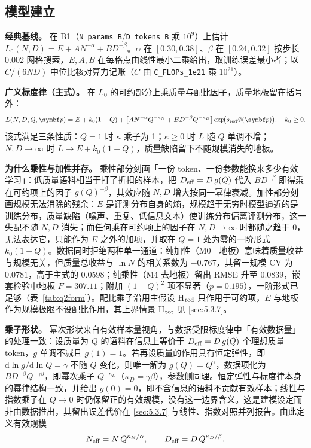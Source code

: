 \subsection{模型建立}
\label{sec:5.3.5}

\textbf{经典基线。} 在 B1（\texttt{N\_params\_B}/\texttt{D\_tokens\_B} 乘 $10^9$）上估计 $L_0(N,D)=E+AN^{-\alpha}+BD^{-\beta}$。$\alpha$ 在 $[0.30,0.38]$、$\beta$ 在 $[0.24,0.32]$ 按步长 $0.002$ 网格搜索，$E,A,B$ 在每格点由线性最小二乘给出，取训练误差最小者；以 $C/(6ND)$ 中位比核对算力记账（$C$ 由 \texttt{C\_FLOPs\_1e21} 乘 $10^{21}$）。

\textbf{广义标度律（主式）。} 在 $L_0$ 的可约部分上乘质量与配比因子，质量地板留在括号外：
\begin{equation*}
L(N,D,Q,\bp)=E+k_0(1-Q)+\bigl[AN^{-\alpha}Q^{-\kappa_N}+BD^{-\beta}Q^{-\kappa_D}\bigr]\exp\!\bigl(s_{\rm red}\tilde\varphi(\bp)\bigr),\quad k_0\ge0 .
\end{equation*}
该式满足三条性质：$Q=1$ 时 $\kappa$ 乘子为 1；$\kappa\ge0$ 时 $L$ 随 $Q$ 单调不增；$N,D\to\infty$ 时 $L\to E+k_0(1-Q)$，质量缺陷留下不随规模消失的地板。

\textbf{为什么乘性与加性并存。} 乘性部分刻画「一份 token、一份参数能换来多少有效学习」：低质量语料相当于打了折扣的样本，把 $D_{\rm eff}=D\,g(Q)$ 代入 $BD^{-\beta}$ 即得乘在可约项上的因子 $g(Q)^{-\beta}$，其效应随 $N,D$ 增大按同一幂律衰减。加性部分刻画规模无法消除的残余：$E$ 是评测分布自身的熵，规模趋于无穷时模型逼近的是训练分布，质量缺陷（噪声、重复、低信息文本）使训练分布偏离评测分布，这一失配不随 $N,D$ 消失；而任何乘在可约项上的因子在 $N,D\to\infty$ 时都随之趋于 0，无法表达它，只能作为 $E$ 之外的加项，并取在 $Q=1$ 处为零的一阶形式 $k_0(1-Q)$。数据同时拒绝两种单一通道：纯加性（M0＋地板）意味着质量收益与规模无关，但质量总收益与 $\ln N$ 的相关系数为 $-0.767$，其留一规模 CV 为 $0.0781$，高于主式的 $0.0598$；纯乘性（M4 去地板）留出 RMSE 升至 $0.0839$，嵌套检验中地板 $F=307.11$；附加 $(1-Q)^2$ 项不显著（$p=0.195$），一阶形式已足够（表~\ref{tab:q2form}）。配比乘子沿用主假设 H$_{\rm red}$ 只作用于可约项，$E$ 与地板作为规模极限不设配比作用，其上界情景 H$_{\rm tot}$ 见 \ref{sec:5.3.7}。

\textbf{乘子形状。} 幂次形状来自有效样本量视角\cite{subramanyam}，与数据受限标度律中「有效数据量」的处理一致\cite{muennighoff}：设质量为 $Q$ 的语料在信息上等价于 $D_{\rm eff}=D\,g(Q)$ 个理想质量 token，$g$ 单调不减且 $g(1)=1$。若再设质量的作用具有恒定弹性，即 $\mathrm d\ln g/\mathrm d\ln Q=\gamma$ 不随 $Q$ 变化，则唯一解为 $g(Q)=Q^{\gamma}$，数据项化为 $BD^{-\beta}Q^{-\gamma\beta}$，即幂次乘子 $Q^{-\kappa_D}$（$\kappa_D=\gamma\beta$），参数侧同理。恒定弹性与标度律本身的幂律结构一致，并给出 $g(0)=0$，即不含信息的语料不贡献有效样本；线性与指数乘子在 $Q\to0$ 时仍保留正的有效规模，没有这一边界含义。这是建模设定而非由数据推出，其留出误差代价在 \ref{sec:5.3.7} 与线性、指数对照并列报告。由此定义有效规模
\begin{equation*}
N_{\rm eff}=N\,Q^{\kappa_N/\alpha},\qquad D_{\rm eff}=D\,Q^{\kappa_D/\beta}.
\end{equation*}

